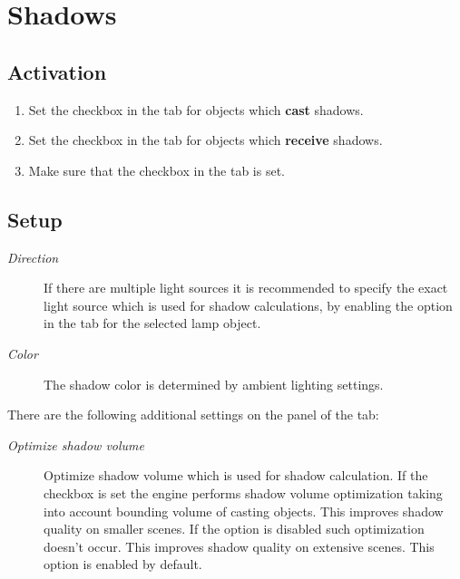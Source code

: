 \documentclass[a4paper,12pt,oneside]{sphinxmanual}
\begin{document}
\section{Shadows}
\label{lighting:id8}

\subsection{Activation}
\label{lighting:id9}\begin{enumerate}
\item {} 
Set the  checkbox in the  tab for objects which \textbf{cast} shadows.

\item {} 
Set the  checkbox in the  tab for objects which \textbf{receive} shadows.

\item {} 
Make sure that the  checkbox in the  tab is set.

\end{enumerate}


\subsection{Setup}
\label{lighting:id10}\begin{description}
\item[{\emph{Direction}}] \leavevmode
If there are multiple light sources it is recommended to specify the exact light source which is used for shadow calculations, by enabling the  option in the  tab for the selected lamp object.

\item[{\emph{Color}}] \leavevmode
The shadow color is determined by ambient lighting settings.

\end{description}

There are the following additional settings on the  panel of the  tab:
\begin{description}
\item[{\emph{Optimize shadow volume}}] \leavevmode
Optimize shadow volume which is used for shadow calculation. If the checkbox is set the engine performs shadow volume optimization taking into account bounding volume of casting objects. This improves shadow quality on smaller scenes. If the option is disabled such optimization doesn't occur. This improves shadow quality on extensive scenes. This option is enabled by default.

\end{description}
\end{document}
